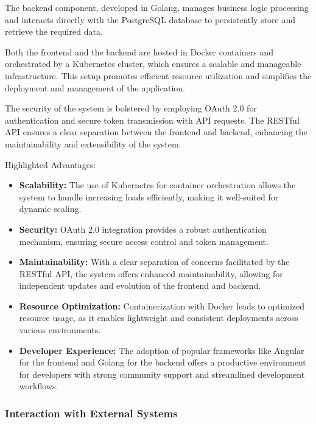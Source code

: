 The backend component, developed in Golang, manages business logic processing and interacts directly with the PostgreSQL database to persistently store and retrieve the required data.

Both the frontend and the backend are hosted in Docker containers and orchestrated by a Kubernetes cluster, which ensures a scalable and manageable infrastructure.
This setup promotes efficient resource utilization and simplifies the deployment and management of the application.

The security of the system is bolstered by employing OAuth 2.0 for authentication and secure token transmission with API requests.
The RESTful API ensures a clear separation between the frontend and backend, enhancing the maintainability and extensibility of the system.

Highlighted Advantages:\\

\begin{itemize}
    \item \textbf{Scalability:} The use of Kubernetes for container orchestration allows the system to handle increasing loads efficiently, making it well-suited for dynamic scaling.
    \item \textbf{Security:} OAuth 2.0 integration provides a robust authentication mechanism, ensuring secure access control and token management.
    \item \textbf{Maintainability:} With a clear separation of concerns facilitated by the RESTful API, the system offers enhanced maintainability, allowing for independent updates and evolution of the frontend and backend.
    \item \textbf{Resource Optimization:} Containerization with Docker leads to optimized resource usage, as it enables lightweight and consistent deployments across various environments.
    \item \textbf{Developer Experience:} The adoption of popular frameworks like Angular for the frontend and Golang for the backend offers a productive environment for developers with strong community support and streamlined development workflows.
\end{itemize}

\subsubsection{Interaction with External Systems}\label{subsubsec:interaction-with-external-systems}

